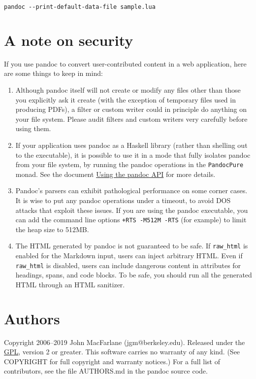 \documentclass[
]{article}
\begin{document}
\begin{verbatim}
pandoc --print-default-data-file sample.lua
\end{verbatim}

\hypertarget{a-note-on-security}{%
\section{A note on security}\label{a-note-on-security}}

If you use pandoc to convert user-contributed content in a web
application, here are some things to keep in mind:

\begin{enumerate}
\def\labelenumi{\arabic{enumi}.}
\item
  Although pandoc itself will not create or modify any files other than
  those you explicitly ask it create (with the exception of temporary
  files used in producing PDFs), a filter or custom writer could in
  principle do anything on your file system. Please audit filters and
  custom writers very carefully before using them.
\item
  If your application uses pandoc as a Haskell library (rather than
  shelling out to the executable), it is possible to use it in a mode
  that fully isolates pandoc from your file system, by running the
  pandoc operations in the \texttt{PandocPure} monad. See the document
  \href{http://pandoc.org/using-the-pandoc-api.html}{Using the pandoc
  API} for more details.
\item
  Pandoc's parsers can exhibit pathological performance on some corner
  cases. It is wise to put any pandoc operations under a timeout, to
  avoid DOS attacks that exploit these issues. If you are using the
  pandoc executable, you can add the command line options
  \texttt{+RTS\ -M512M\ -RTS} (for example) to limit the heap size to
  512MB.
\item
  The HTML generated by pandoc is not guaranteed to be safe. If
  \texttt{raw\_html} is enabled for the Markdown input, users can inject
  arbitrary HTML. Even if \texttt{raw\_html} is disabled, users can
  include dangerous content in attributes for headings, spans, and code
  blocks. To be safe, you should run all the generated HTML through an
  HTML sanitizer.
\end{enumerate}

\hypertarget{authors}{%
\section{Authors}\label{authors}}

Copyright 2006--2019 John MacFarlane (jgm@berkeley.edu). Released under
the \href{http://www.gnu.org/copyleft/gpl.html}{GPL}, version 2 or
greater. This software carries no warranty of any kind. (See COPYRIGHT
for full copyright and warranty notices.) For a full list of
contributors, see the file AUTHORS.md in the pandoc source code.
\end{document}
